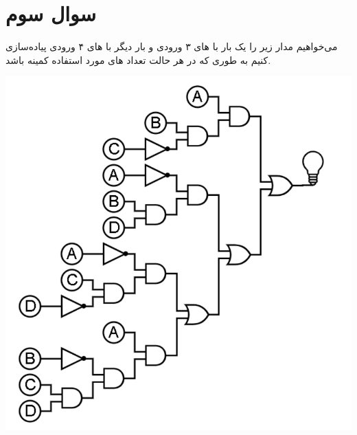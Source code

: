 \section{سوال سوم}
می‌خواهیم مدار زیر را یک بار با های ۳ ورودی و بار دیگر با های ۴ ورودی پیاده‌سازی کنیم به طوری که در هر حالت تعداد های مورد استفاده کمینه باشد.


\begin{center}
	\includegraphics*[width=0.6\linewidth]{pics/img1.png}
\end{center}



\begin{qsolve}
	
\end{qsolve}